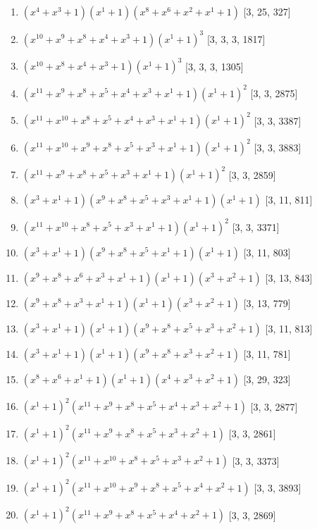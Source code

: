 \documentclass[10pt,twocolumn]{article}
\begin{document}
\begin{enumerate}
\item $(x^{4} + x^{3} + 1)(x^{1} + 1)(x^{8} + x^{6} + x^{2} + x^{1} + 1)$  [3, 25, 327]
\item $(x^{10} + x^{9} + x^{8} + x^{4} + x^{3} + 1)(x^{1} + 1)^{3}$  [3, 3, 3, 1817]
\item $(x^{10} + x^{8} + x^{4} + x^{3} + 1)(x^{1} + 1)^{3}$  [3, 3, 3, 1305]
\item $(x^{11} + x^{9} + x^{8} + x^{5} + x^{4} + x^{3} + x^{1} + 1)(x^{1} + 1)^{2}$  [3, 3, 2875]
\item $(x^{11} + x^{10} + x^{8} + x^{5} + x^{4} + x^{3} + x^{1} + 1)(x^{1} + 1)^{2}$  [3, 3, 3387]
\item $(x^{11} + x^{10} + x^{9} + x^{8} + x^{5} + x^{3} + x^{1} + 1)(x^{1} + 1)^{2}$  [3, 3, 3883]
\item $(x^{11} + x^{9} + x^{8} + x^{5} + x^{3} + x^{1} + 1)(x^{1} + 1)^{2}$  [3, 3, 2859]
\item $(x^{3} + x^{1} + 1)(x^{9} + x^{8} + x^{5} + x^{3} + x^{1} + 1)(x^{1} + 1)$  [3, 11, 811]
\item $(x^{11} + x^{10} + x^{8} + x^{5} + x^{3} + x^{1} + 1)(x^{1} + 1)^{2}$  [3, 3, 3371]
\item $(x^{3} + x^{1} + 1)(x^{9} + x^{8} + x^{5} + x^{1} + 1)(x^{1} + 1)$  [3, 11, 803]
\item $(x^{9} + x^{8} + x^{6} + x^{3} + x^{1} + 1)(x^{1} + 1)(x^{3} + x^{2} + 1)$  [3, 13, 843]
\item $(x^{9} + x^{8} + x^{3} + x^{1} + 1)(x^{1} + 1)(x^{3} + x^{2} + 1)$  [3, 13, 779]
\item $(x^{3} + x^{1} + 1)(x^{1} + 1)(x^{9} + x^{8} + x^{5} + x^{3} + x^{2} + 1)$  [3, 11, 813]
\item $(x^{3} + x^{1} + 1)(x^{1} + 1)(x^{9} + x^{8} + x^{3} + x^{2} + 1)$  [3, 11, 781]
\item $(x^{8} + x^{6} + x^{1} + 1)(x^{1} + 1)(x^{4} + x^{3} + x^{2} + 1)$  [3, 29, 323]
\item $(x^{1} + 1)^{2}(x^{11} + x^{9} + x^{8} + x^{5} + x^{4} + x^{3} + x^{2} + 1)$  [3, 3, 2877]
\item $(x^{1} + 1)^{2}(x^{11} + x^{9} + x^{8} + x^{5} + x^{3} + x^{2} + 1)$  [3, 3, 2861]
\item $(x^{1} + 1)^{2}(x^{11} + x^{10} + x^{8} + x^{5} + x^{3} + x^{2} + 1)$  [3, 3, 3373]
\item $(x^{1} + 1)^{2}(x^{11} + x^{10} + x^{9} + x^{8} + x^{5} + x^{4} + x^{2} + 1)$  [3, 3, 3893]
\item $(x^{1} + 1)^{2}(x^{11} + x^{9} + x^{8} + x^{5} + x^{4} + x^{2} + 1)$  [3, 3, 2869]

\end{enumerate}
\end{document}
